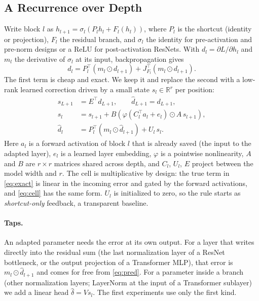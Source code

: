 \documentclass{article}
\newcommand{\dhat}{\hat{d}}
\newcommand{\deltahat}{\hat{\delta}}
\begin{document}
\subsection{A Recurrence over Depth}
\label{sec:recurrence}

Write block $l$ as $h_{l+1} = \sigma_l\!\left(P_l h_l + F_l(h_l)\right)$, where
$P_l$ is the shortcut (identity or projection), $F_l$ the residual branch, and
$\sigma_l$ the identity for pre-activation and pre-norm designs or a ReLU for
post-activation ResNets. With $d_l = \partial L/\partial h_l$ and $m_l$ the
derivative of $\sigma_l$ at its input, backpropagation gives
\begin{equation}
d_l = P_l^\top (m_l \odot d_{l+1}) + J_{F_l}^\top (m_l \odot d_{l+1}).
\label{eq:exact}
\end{equation}
The first term is cheap and exact. We keep it and replace the second with a
low-rank learned correction driven by a small state $s_l \in \mathbb{R}^r$ per
position:
\begin{align}
s_{L+1} &= E^\top d_{L+1}, \qquad \dhat_{L+1} = d_{L+1}, \\
s_l &= s_{l+1} + B\left(\varphi\!\left(C_l^\top a_l + e_l\right) \odot A\, s_{l+1}\right),
\label{eq:cell} \\
\dhat_l &= P_l^\top (m_l \odot \dhat_{l+1}) + U_l\, s_l .
\label{eq:pred}
\end{align}
Here $a_l$ is a forward activation of block $l$ that is already saved (the
input to the adapted layer), $e_l$ is a learned layer embedding, $\varphi$ is a
pointwise nonlinearity, $A$ and $B$ are $r \times r$ matrices shared across
depth, and $C_l$, $U_l$, $E$ project between the model width and $r$. The cell
is multiplicative by design: the true term in \eqref{eq:exact} is linear in the
incoming error and gated by the forward activations, and \eqref{eq:cell} has
the same form. $U_l$ is initialized to zero, so the rule starts as
\emph{shortcut-only} feedback, a transparent baseline.

\paragraph{Taps.} An adapted parameter needs the error at its own output. For a
layer that writes directly into the residual sum (the last normalization layer
of a ResNet bottleneck, or the output projection of a Transformer MLP), that
error is $m_l \odot \dhat_{l+1}$ and comes for free from \eqref{eq:pred}. For a
parameter inside a branch (other normalization layers; LayerNorm at the input
of a Transformer sublayer) we add a linear head $\deltahat = V s_l$. The first
experiments use only the first kind.
\end{document}
